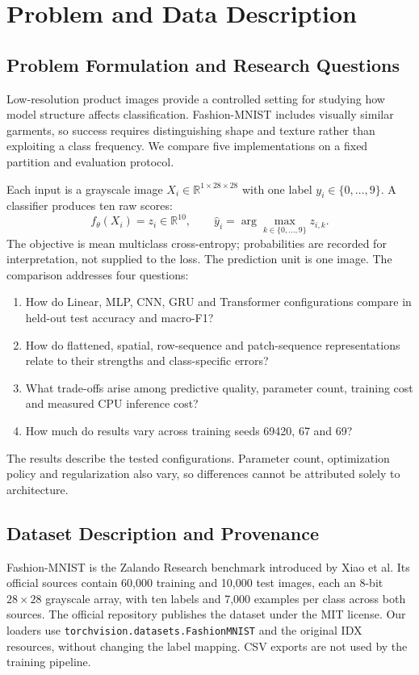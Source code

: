 \section{Problem and Data Description}
\label{sec:data}
\subsection{Problem Formulation and Research Questions}
Low-resolution product images provide a controlled setting for studying how model
structure affects classification. Fashion-MNIST includes visually similar garments,
so success requires distinguishing shape and texture rather than exploiting a class
frequency. We compare five implementations on a fixed partition and evaluation protocol.

Each input is a grayscale image \(X_i\in\mathbb{R}^{1\times28\times28}\) with one label
\(y_i\in\{0,\ldots,9\}\). A classifier produces ten raw scores:
\[
 f_\theta(X_i)=z_i\in\mathbb{R}^{10},\qquad
 \widehat y_i=\arg\max_{k\in\{0,\ldots,9\}} z_{i,k}.
\]
The objective is mean multiclass cross-entropy; probabilities are recorded for
interpretation, not supplied to the loss. The prediction unit is one image.
The comparison addresses four questions:
\begin{enumerate}
\item How do Linear, MLP, CNN, GRU and Transformer configurations compare in held-out
test accuracy and macro-F1?
\item How do flattened, spatial, row-sequence and patch-sequence representations relate
to their strengths and class-specific errors?
\item What trade-offs arise among predictive quality, parameter count, training cost
and measured CPU inference cost?
\item How much do results vary across training seeds 69420, 67 and 69?
\end{enumerate}
The results describe the tested configurations. Parameter count, optimization policy
and regularization also vary, so differences cannot be attributed solely to architecture.

\subsection{Dataset Description and Provenance}
Fashion-MNIST is the Zalando Research benchmark introduced by Xiao et al.\citep{fashion}
Its official sources contain 60,000 training and 10,000 test images, each an 8-bit
\(28\times28\) grayscale array, with ten labels and 7,000 examples per class across
both sources. The official repository publishes the dataset under the MIT
license.\citep{fashionlicense} Our loaders use
\texttt{torchvision.datasets.FashionMNIST} and the original IDX resources, without
changing the label mapping. CSV exports are not used by the training pipeline.

